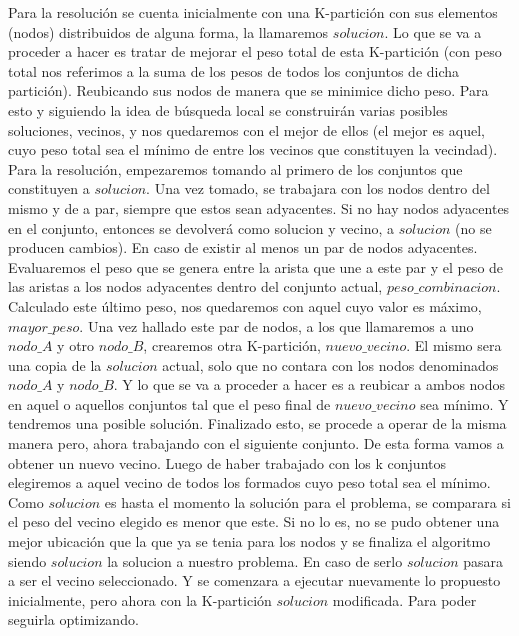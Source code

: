 \documentclass[a4paper]{article}
\begin{document}
Para la resoluci\'on se cuenta inicialmente con una K-partici\'on con sus elementos (nodos) distribuidos de alguna forma, la llamaremos $solucion$. Lo que se va a proceder a hacer es tratar de mejorar el peso total de esta K-partici\'on (con peso total nos referimos a la suma de los pesos de todos los conjuntos de dicha partici\'on). Reubicando sus nodos de manera que se minimice dicho peso.
Para esto y siguiendo la idea de b\'usqueda local se construir\'an varias posibles soluciones, vecinos, y nos quedaremos con el mejor de ellos (el mejor es aquel, cuyo peso total sea el m\'inimo de entre los vecinos que constituyen la vecindad).  
Para la resoluci\'on, empezaremos tomando al primero de los conjuntos  que constituyen a $solucion$. Una vez tomado, se trabajara con los nodos dentro del mismo y de a par, siempre que estos sean adyacentes. Si no hay nodos adyacentes en el conjunto, entonces se devolver\'a como solucion y vecino, a $solucion$ (no se producen cambios). En caso de existir al menos un  par de nodos adyacentes. Evaluaremos el peso que se genera entre la arista que une a este par y el peso de las aristas a los nodos adyacentes dentro del conjunto actual, $peso\_combinacion$. Calculado este \'ultimo peso, nos quedaremos con aquel cuyo valor es m\'aximo, $mayor\_peso$. Una vez hallado este par de nodos, a los que llamaremos a uno $nodo\_A$ y otro $nodo\_B$, crearemos otra K-partici\'on, $nuevo\_vecino$. El mismo sera una copia de la $solucion$ actual, solo que no contara con los nodos denominados $nodo\_A$ y $nodo\_B$.  Y lo que se va a proceder a hacer es a reubicar a ambos nodos en aquel o aquellos conjuntos tal que el peso final de $nuevo\_vecino$ sea m\'inimo. Y tendremos una posible soluci\'on. Finalizado esto, se procede a operar de la misma manera pero, ahora trabajando con el siguiente conjunto. De esta forma vamos a obtener un nuevo vecino. Luego de haber trabajado con los k conjuntos elegiremos a aquel vecino de todos los formados cuyo peso total sea el m\'inimo. Como $solucion$ es hasta el momento la soluci\'on para el problema, se comparara si el peso del vecino elegido es menor que este. Si no lo es, no se pudo obtener una mejor ubicaci\'on  que la que ya se tenia para los nodos y se finaliza el algoritmo siendo $solucion$ la solucion a nuestro problema. En caso de serlo $solucion$ pasara a ser el vecino seleccionado. Y se comenzara a ejecutar nuevamente lo propuesto inicialmente, pero ahora con la K-partici\'on $solucion$ modificada. Para poder seguirla optimizando.
\end{document}
